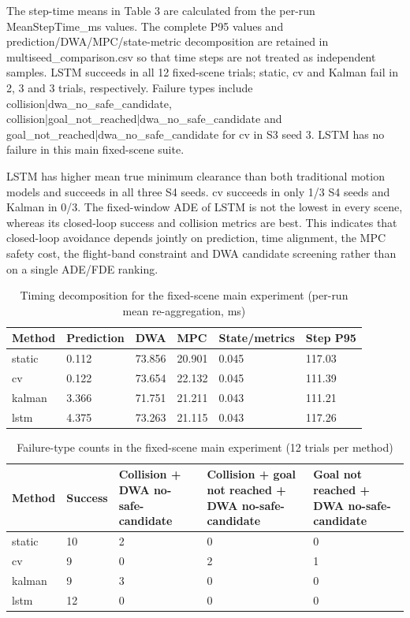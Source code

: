 \documentclass[10pt,a4paper]{article}
\begin{document}
The step-time means in Table 3 are calculated from the per-run MeanStepTime\_ms values. The complete P95 values and prediction/DWA/MPC/state-metric decomposition are retained in multiseed\_comparison.csv so that time steps are not treated as independent samples. LSTM succeeds in all 12 fixed-scene trials; static, cv and Kalman fail in 2, 3 and 3 trials, respectively. Failure types include collision|dwa\_no\_safe\_candidate, collision|goal\_not\_reached|dwa\_no\_safe\_candidate and goal\_not\_reached|dwa\_no\_safe\_candidate for cv in S3 seed 3. LSTM has no failure in this main fixed-scene suite.

LSTM has higher mean true minimum clearance than both traditional motion models and succeeds in all three S4 seeds. cv succeeds in only 1/3 S4 seeds and Kalman in 0/3. The fixed-window ADE of LSTM is not the lowest in every scene, whereas its closed-loop success and collision metrics are best. This indicates that closed-loop avoidance depends jointly on prediction, time alignment, the MPC safety cost, the flight-band constraint and DWA candidate screening rather than on a single ADE/FDE ranking.

\begin{table}[t]
\centering
\small
\caption{Timing decomposition for the fixed-scene main experiment (per-run mean re-aggregation, ms)}
\label{tab:table-4}
\begin{tabularx}{\linewidth}{YYYYYY}
\toprule
Method & Prediction & DWA & MPC & State/metrics & Step P95 \\
\midrule
static & 0.112 & 73.856 & 20.901 & 0.045 & 117.03 \\
cv & 0.122 & 73.654 & 22.132 & 0.045 & 111.39 \\
kalman & 3.366 & 71.751 & 21.211 & 0.043 & 111.21 \\
lstm & 4.375 & 73.263 & 21.115 & 0.043 & 117.26 \\
\bottomrule
\end{tabularx}
\end{table}

\begin{table}[t]
\centering
\small
\caption{Failure-type counts in the fixed-scene main experiment (12 trials per method)}
\label{tab:table-5}
\begin{tabularx}{\linewidth}{YYYYY}
\toprule
Method & Success & Collision + DWA no-safe-candidate & Collision + goal not reached + DWA no-safe-candidate & Goal not reached + DWA no-safe-candidate \\
\midrule
static & 10 & 2 & 0 & 0 \\
cv & 9 & 0 & 2 & 1 \\
kalman & 9 & 3 & 0 & 0 \\
lstm & 12 & 0 & 0 & 0 \\
\bottomrule
\end{tabularx}
\end{table}
\end{document}
